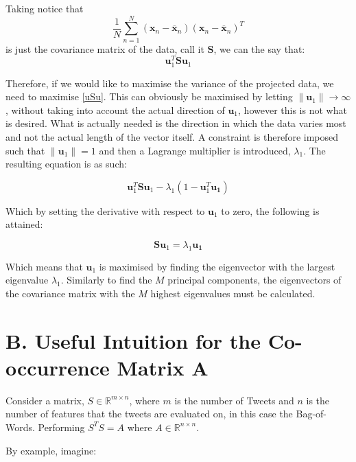 \documentclass[11pt,a4paper]{article}
\begin{document}
Taking notice that 
\begin{equation*}
\frac{1}{N} \sum_{n = 1}^N \left(\mathbf{x}_n - \mathbf{\overline{x}}_n\right)\left(\mathbf{x}_n - \mathbf{\overline{x}}_n\right)^T 
\end{equation*} 
is just the covariance matrix of the data, call it $\mathbf{S}$, we can the say that:
\begin{equation}
\mathbf{u}_1^T \mathbf{S} \mathbf{u}_1
\label{uSu}
\end{equation} 

Therefore, if we would like to maximise the variance of the projected data, we need to maximise \eqref{uSu}. This can obviously be maximised by letting $\|\mathbf{u}_1\| \to \infty$, without taking into account the actual direction of $\mathbf{u}_1$, however this is not what is desired. What is actually needed is the direction in which the data varies most and not the actual length of the vector itself. A constraint is therefore imposed such that $\|\mathbf{u}_1\| = 1$ and then a Lagrange multiplier is introduced, $\lambda_1$. The resulting equation is as such:


\begin{equation*}
\mathbf{u}_1^T \mathbf{S} \mathbf{u}_1 - \lambda_1 (1 - \mathbf{u}_1^T \mathbf{u_1})
\label{lagrange_uSu}
\end{equation*} 

Which by setting the derivative with respect to $\mathbf{u}_1$ to zero, the following is attained:


\begin{equation*}
\mathbf{S} \mathbf{u}_1 = \lambda_1  \mathbf{u_1}
\label{eig_uSu}
\end{equation*} 

Which means that $\mathbf{u}_1$ is maximised by finding the eigenvector with the largest eigenvalue $\lambda_1$. Similarly to find the $M$ principal components, the eigenvectors of the covariance matrix with the $M$ highest eigenvalues must be calculated.
\clearpage
\section*{B. Useful Intuition for the Co-occurrence Matrix $\mathbf{A}$}
Consider a matrix, $S\in \mathbb{R}^{m\times n}$, where $m$ is the number of Tweets and $n$ is the number of features that the tweets are evaluated on, in this case the Bag-of-Words. Performing $S^TS = A$ where $A \in \mathbb{R}^{n\times n}$. 

By example, imagine:
\end{document}
